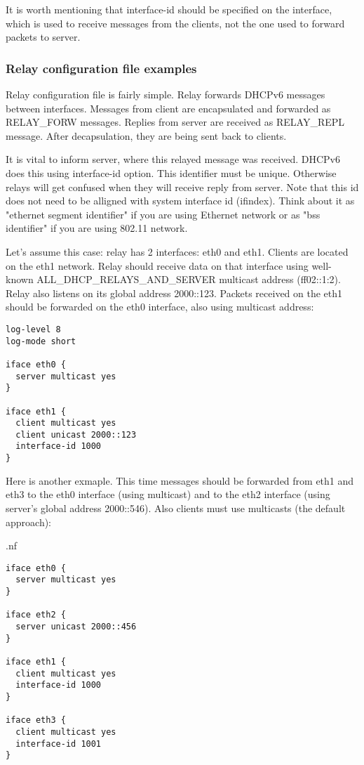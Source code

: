 It is worth mentioning that interface-id should be specified on the
interface, which is used to receive messages from the clients, not the
one used to forward packets to server.

\subsubsection{Relay configuration file examples}

Relay configuration file is fairly simple. Relay forwards DHCPv6
messages between interfaces. Messages from client are encapsulated and
forwarded as RELAY\_FORW messages. Replies from server are received as
RELAY\_REPL message. After decapsulation, they are being sent back to
clients. 

It is vital to inform server, where this relayed message was
received. DHCPv6 does this using interface-id option. This identifier
must be unique. Otherwise relays will get confused when they will
receive reply from server. Note that this id does not need to be
alligned with system interface id (ifindex). Think about it as
"ethernet segment identifier" if you are using Ethernet network or as
"bss identifier" if you are using 802.11 network.

Let's assume this case: relay has 2 interfaces: eth0 and
eth1. Clients are located on the eth1 network. Relay should receive
data on that interface using well-known ALL\_DHCP\_RELAYS\_AND\_SERVER
multicast address (ff02::1:2). Relay also listens on its global
address 2000::123. Packets received on the eth1 should be forwarded on
the eth0 interface, also using multicast address:

\begin{verbatim}
log-level 8
log-mode short

iface eth0 {
  server multicast yes
}

iface eth1 {
  client multicast yes
  client unicast 2000::123
  interface-id 1000
}
\end{verbatim}

Here is another exmaple. This time messages should be forwarded from
eth1 and eth3 to the eth0 interface (using multicast) and to the eth2
interface (using server's global address 2000::546). Also clients must
use multicasts (the default approach):

.nf
\begin{verbatim}
iface eth0 {
  server multicast yes
}

iface eth2 {
  server unicast 2000::456
}

iface eth1 {
  client multicast yes                    
  interface-id 1000
}

iface eth3 {
  client multicast yes                    
  interface-id 1001
}
\end{verbatim}

